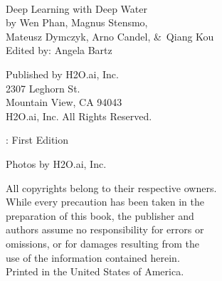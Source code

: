 

\newpage
\restoregeometry

\null\vfill %

\thispagestyle{empty}%
{\raggedright\vfill\ 

Deep Learning with Deep Water\\

by Wen Phan, Magnus Stensmo, \\ 
Mateusz Dymczyk, Arno Candel, \&\ Qiang Kou\\
Edited by: Angela Bartz

\bigskip
Published by H2O.ai, Inc. \\
2307 Leghorn St. \\
Mountain View, CA 94043\\
\bigskip
{} H2O.ai, Inc. All Rights Reserved. 
\bigskip

\monthname \hspace{1pt}  \the\year: First Edition
\bigskip

Photos by \textcopyright H2O.ai, Inc. 
\bigskip

All copyrights belong to their respective owners.\\
While every precaution has been taken in the\\
preparation of this book, the publisher and\\
authors assume no responsibility for errors or\\
omissions, or for damages resulting from the\\
use of the information contained herein.\\
\bigskip
Printed in the United States of America. 
}

\newpage
\thispagestyle{empty}%

\tableofcontents


\newpage

